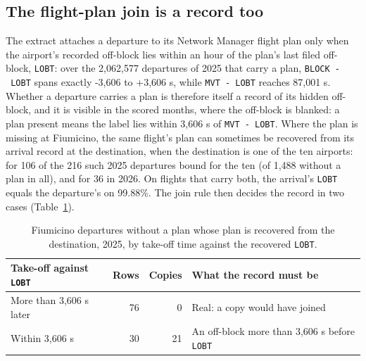 \documentclass[
  manuscript=article,
  layout=preprint,
  year=2026,
  volume=x,
]{extra/joas}
\begin{document}
\subsection{The flight-plan join is a record too}\label{sec:4.7}

The extract attaches a departure to its Network Manager flight plan only when the airport's recorded off-block lies within an hour of the plan's last filed off-block, \texttt{LOBT}: over the 2,062,577 departures of 2025 that carry a plan, \texttt{BLOCK\ -\ LOBT} spans exactly -3,606 to +3,606 s, while \texttt{MVT\ -\ LOBT} reaches 87,001 s. Whether a departure carries a plan is therefore itself a record of its hidden off-block, and it is visible in the scored months, where the off-block is blanked: a plan present means the label lies within 3,606 s of \texttt{MVT\ -\ LOBT}. Where the plan is missing at Fiumicino, the same flight's plan can sometimes be recovered from its arrival record at the destination, when the destination is one of the ten airports: for 106 of the 216 such 2025 departures bound for the ten (of 1,488 without a plan in all), and for 36 in 2026. On flights that carry both, the arrival's \texttt{LOBT} equals the departure's on 99.88\%. The join rule then decides the record in two cases (Table~\ref{tab:8}).

\begin{table}[htbp!]
  \centering
  \small
  \setlength{\tabcolsep}{5pt}\renewcommand{\arraystretch}{1.15}
  \caption{Fiumicino departures without a plan whose plan is recovered from the destination, 2025, by take-off time against the recovered \texttt{LOBT}.}
  \label{tab:8}
  \begin{tabular*}{\linewidth}{@{\extracolsep{\fill}}lrrl}
  \toprule
  \textbf{Take-off against \texttt{LOBT}} & \textbf{Rows} & \textbf{Copies} & \textbf{What the record must be} \\
  \midrule
  More than 3,606 s later & 76 & 0 & Real: a copy would have joined \\
  Within 3,606 s & 30 & 21 & An off-block more than 3,606 s before \texttt{LOBT} \\
  \bottomrule
  \end{tabular*}
\end{table}
\end{document}
